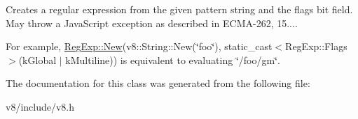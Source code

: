 Creates a regular expression from the given pattern string and the flags bit field. May throw a Java\+Script exception as described in E\+C\+M\+A-\/262, 15....

For example, \mbox{\hyperlink{classv8_1_1RegExp_a805f632fe98d58160773a4ba1e424b15}{Reg\+Exp\+::\+New}}(v8\+::\+String\+::\+New(\char`\"{}foo\char`\"{}), static\+\_\+cast$<$\+Reg\+Exp\+::\+Flags$>$(k\+Global $\vert$ k\+Multiline)) is equivalent to evaluating \char`\"{}/foo/gm\char`\"{}. 

The documentation for this class was generated from the following file\+:\begin{DoxyCompactItemize}
\item 
v8/include/v8.\+h\end{DoxyCompactItemize}
